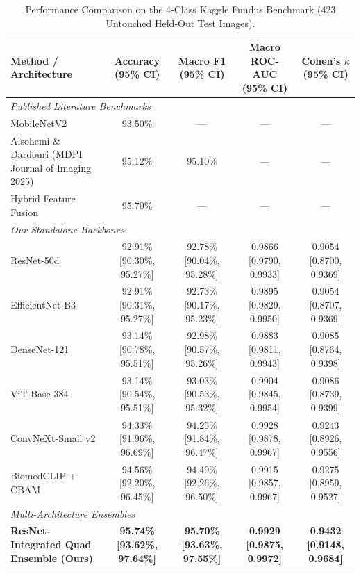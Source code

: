 \begin{table}[t]
\centering
\caption{Performance Comparison on the 4-Class Kaggle Fundus Benchmark (423 Untouched Held-Out Test Images).}
\label{tab:4class_benchmarks}
\small
\begin{tabular}{lcccc}
\hline
\textbf{Method / Architecture} & \textbf{Accuracy (95\% CI)} & \textbf{Macro F1 (95\% CI)} & \textbf{Macro ROC-AUC (95\% CI)} & \textbf{Cohen's $\kappa$ (95\% CI)} \\
\hline
\multicolumn{5}{l}{\textit{Published Literature Benchmarks}} \\
MobileNetV2 \cite{alsohemi2025} & 93.50\% & --- & --- & --- \\
Alsohemi \& Dardouri (MDPI Journal of Imaging 2025) \cite{alsohemi2025} & 95.12\% & 95.10\% & --- & --- \\
Hybrid Feature Fusion \cite{alsohemi2025} & 95.70\% & --- & --- & --- \\
\hline
\multicolumn{5}{l}{\textit{Our Standalone Backbones}} \\
ResNet-50d & 92.91\% [90.30\%, 95.27\%] & 92.78\% [90.04\%, 95.28\%] & 0.9866 [0.9790, 0.9933] & 0.9054 [0.8700, 0.9369] \\
EfficientNet-B3 & 92.91\% [90.31\%, 95.27\%] & 92.73\% [90.17\%, 95.23\%] & 0.9895 [0.9829, 0.9950] & 0.9054 [0.8707, 0.9369] \\
DenseNet-121 & 93.14\% [90.78\%, 95.51\%] & 92.98\% [90.57\%, 95.26\%] & 0.9883 [0.9811, 0.9943] & 0.9085 [0.8764, 0.9398] \\
ViT-Base-384 & 93.14\% [90.54\%, 95.51\%] & 93.03\% [90.53\%, 95.32\%] & 0.9904 [0.9845, 0.9954] & 0.9086 [0.8739, 0.9399] \\
ConvNeXt-Small v2 & 94.33\% [91.96\%, 96.69\%] & 94.25\% [91.84\%, 96.47\%] & 0.9928 [0.9878, 0.9967] & 0.9243 [0.8926, 0.9556] \\
BiomedCLIP + CBAM & 94.56\% [92.20\%, 96.45\%] & 94.49\% [92.26\%, 96.50\%] & 0.9915 [0.9857, 0.9967] & 0.9275 [0.8959, 0.9527] \\
\hline
\multicolumn{5}{l}{\textit{Multi-Architecture Ensembles}} \\
\textbf{ResNet-Integrated Quad Ensemble (Ours)} & \textbf{95.74\% [93.62\%, 97.64\%]} & \textbf{95.70\% [93.63\%, 97.55\%]} & \textbf{0.9929 [0.9875, 0.9972]} & \textbf{0.9432 [0.9148, 0.9684]} \\
\hline
\end{tabular}
\end{table}
